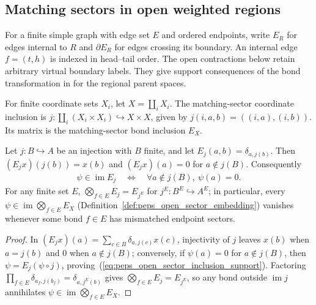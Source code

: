\subsection{Matching sectors in open weighted regions}
\label{sec:peps_open_sector_support}

For a finite simple graph with edge set $E$ and ordered endpoints, write
$E_R$ for edges internal to $R$ and $\partial E_R$ for edges crossing its
boundary.
An internal edge $f=(t,h)$ is indexed in head--tail order.
The open contractions below retain arbitrary virtual boundary labels.
They give support consequences of the bond transformation in
\cite[Section~7]{Schuch2010PEPS} for the regional parent spaces.

\begin{definition}%
    \label{def:peps_open_sector_embedding}
    \leanok
    For finite coordinate sets $X_i$, let $X=\coprod_iX_i$.
    The matching-sector coordinate inclusion is
    $j:\coprod_i(X_i\times X_i)\hookrightarrow X\times X$,
    given by $j(i,a,b)=((i,a),(i,b))$.
    Its matrix is the matching-sector bond inclusion $E_X$.
\end{definition}

\begin{lemma}%
    \label{thm:peps_open_sector_coordinate_support}
    \leanok
    Let $j:B\hookrightarrow A$ be an injection with $B$ finite, and
    let $E_j(a,b)=\delta_{a,j(b)}$.
    Then $(E_jx)(j(b))=x(b)$ and $(E_jx)(a)=0$ for $a\notin j(B)$.
    Consequently
    \begin{align}
        \psi\in\operatorname{im}E_j
        \quad\Longleftrightarrow\quad
        \forall a\notin j(B),\ \psi(a)=0.
        \label{eq:peps_open_sector_inclusion_support}
    \end{align}
    For any finite set $E$, $\bigotimes_{f\in E}E_j=E_{j^E}$ for
    $j^E:B^E\hookrightarrow A^E$; in particular, every
    $\psi\in\operatorname{im}\bigotimes_{f\in E}E_X$
    (Definition~\ref{def:peps_open_sector_embedding}) vanishes whenever some
    bond $f\in E$ has mismatched endpoint sectors.
\end{lemma}
\begin{proof}\leanok
    In $(E_jx)(a)=\sum_{c\in B}\delta_{a,j(c)}x(c)$, injectivity of $j$ leaves
    $x(b)$ when $a=j(b)$ and $0$ when $a\notin j(B)$; conversely, if
    $\psi(a)=0$ for $a\notin j(B)$, then $\psi=E_j(\psi\circ j)$, proving~(\ref{eq:peps_open_sector_inclusion_support}).
    Factoring $\prod_{f\in E}\delta_{a_f,j(b_f)}=\delta_{a,j^E(b)}$ gives
    $\bigotimes_{f\in E}E_j=E_{j^E}$, so any bond outside $\operatorname{im}j$
    annihilates $\psi\in\operatorname{im}\bigotimes_{f\in E}E_X$.
\end{proof}

